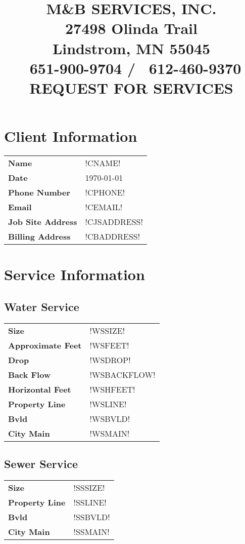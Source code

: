 \documentclass{article}
\title{\textbf{M\&B SERVICES, INC.}\\
    \large 27498 Olinda Trail \\
    Lindstrom, MN 55045 \\
    \Telefon\ 651-900-9704 / \fax\ 612-460-9370 \\
    \hfill \break 
    \textbf{REQUEST FOR SERVICES}}
\author{}
\date{}
\begin{document}
\maketitle

\section*{Client Information}

\begin{tabularx}{\textwidth}{p{100px} X}
    \textbf{Name} & !CNAME! \\
    \textbf{Date} & \today \\
    \textbf{Phone Number} & !CPHONE! \\
    \textbf{Email} & !CEMAIL! \\
    \textbf{Job Site Address} & !CJSADDRESS! \\
    \textbf{Billing Address} & !CBADDRESS! \\
\end{tabularx}

\section*{Service Information}

\subsection*{Water Service}
\begin{tabularx}{\textwidth}{p{100px} X}
    \textbf{Size} & !WSSIZE! \\
    \textbf{Approximate Feet} & !WSFEET! \\
    \textbf{Drop} & !WSDROP! \\
    \textbf{Back Flow} & !WSBACKFLOW! \\
    \textbf{Horizontal Feet} & !WSHFEET! \\
    \textbf{Property Line} & !WSLINE! \\
    \textbf{Bvld} & !WSBVLD! \\
    \textbf{City Main} & !WSMAIN! \\
\end{tabularx}

\subsection*{Sewer Service}
\begin{tabularx}{\textwidth}{p{100px} X}
    \textbf{Size} & !SSSIZE! \\
    \textbf{Property Line} & !SSLINE! \\
    \textbf{Bvld} & !SSBVLD! \\
    \textbf{City Main} & !SSMAIN! \\
\end{tabularx}
\end{document}
